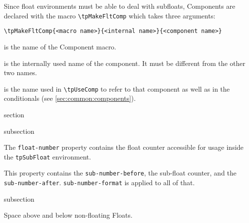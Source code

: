 Since float environments must be able to deal with subfloats,
Components are declared with the macro \lstinline{\tpMakeFltComp}
which takes three arguments:
\begin{lstlisting}[style=tex]
\tpMakeFltComp{<macro name>}{<internal name>}{<component name>}
\end{lstlisting}
\begin{description}[35mm]
\item[\texttt{<macro name>}] is the name of the Component macro.
\item[\texttt{<internal name>}] is the internally used name of the component. It must be different from the other two names.
\item[\texttt{<component name>}] is the name used in \lstinline{\tpUseComp} to refer to that component as well as in the conditionals (see \autoref{sec:common:components}).
\end{description}



\begin{heading}[label=sec:flt:props]{section}
\end{heading}


\begin{heading}[label=sec:flt:props:undef]{subsection}
\end{heading}


The \lstinline{float-number} property contains the float counter
accessible for usage inside the \lstinline{tpSubFloat} environment.


This property contains the \lstinline{sub-number-before}, the
sub-float counter, and the
\lstinline{sub-number-after}. \lstinline{sub-number-format} is applied
to all of that.



\begin{heading}[label=sec:flt:spacing]{subsection}
\end{heading}


Space above and below non-floating Floats.


